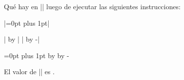 


\bigskip

\enunciadoS Qu\'e hay en || luego de ejecutar las siguientes
instrucciones:

|=0pt plus 1pt|

|\advance{} by | \kern0.4cm |\advance{} by -|

=0pt plus 1pt
\advance{} by 
\advance{} by -

\bigskip 
\respuestaS El valor de || es \the{}.

\bye

